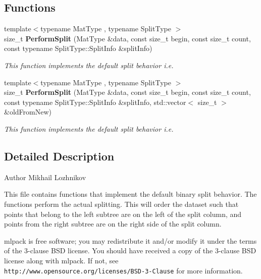\subsection*{Functions}
\begin{DoxyCompactItemize}
\item 
{\footnotesize template$<$typename Mat\+Type , typename Split\+Type $>$ }\\size\+\_\+t \textbf{ Perform\+Split} (Mat\+Type \&data, const size\+\_\+t begin, const size\+\_\+t count, const typename Split\+Type\+::\+Split\+Info \&split\+Info)
\begin{DoxyCompactList}\small\item\em This function implements the default split behavior i.\+e. \end{DoxyCompactList}\item 
{\footnotesize template$<$typename Mat\+Type , typename Split\+Type $>$ }\\size\+\_\+t \textbf{ Perform\+Split} (Mat\+Type \&data, const size\+\_\+t begin, const size\+\_\+t count, const typename Split\+Type\+::\+Split\+Info \&split\+Info, std\+::vector$<$ size\+\_\+t $>$ \&old\+From\+New)
\begin{DoxyCompactList}\small\item\em This function implements the default split behavior i.\+e. \end{DoxyCompactList}\end{DoxyCompactItemize}


\subsection{Detailed Description}
\begin{DoxyAuthor}{Author}
Mikhail Lozhnikov
\end{DoxyAuthor}
This file contains functions that implement the default binary split behavior. The functions perform the actual splitting. This will order the dataset such that points that belong to the left subtree are on the left of the split column, and points from the right subtree are on the right side of the split column.

mlpack is free software; you may redistribute it and/or modify it under the terms of the 3-\/clause B\+SD license. You should have received a copy of the 3-\/clause B\+SD license along with mlpack. If not, see {\tt http\+://www.\+opensource.\+org/licenses/\+B\+S\+D-\/3-\/\+Clause} for more information. 